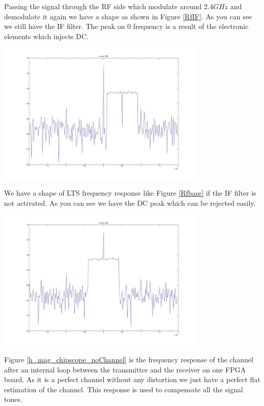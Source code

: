 Passing the signal through the RF side which modulate around $2.4 GHz$ and demodulate it again we have a shape as shown in Figure \ref{RfIF}. As you can see we still have the IF filter. The peak on 0 frequency is a result of the electronic elements which injects DC.\\

\begin{center}
\includegraphics[width=10cm]{content/fig/RfIF.JPG}
\label{RfIF}
\end{center}

We have a shape of LTS frequency response like Figure \ref{Rfbase} if the IF filter is not activated. As you can see we have the DC peak which can be rejected easily.\\

\begin{center}
\includegraphics[width=10cm]{content/fig/Rfbase.JPG}
\label{Rfbase}
\end{center}

Figure \ref{h_mag_chipscope_noChannel} is the frequency response of the channel after an internal loop between the transmitter and the receiver on one FPGA board. As it is a perfect channel without any distortion we just have a perfect flat estimation of the channel. This response is used to compensate all the signal tones.\\

